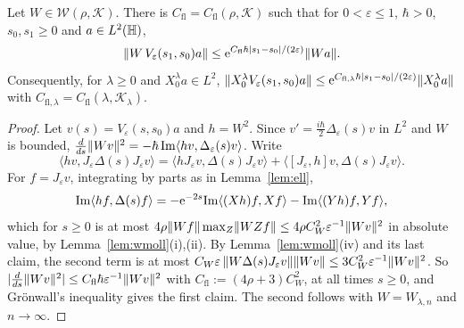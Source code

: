 \begin{proposition}\label{prop:ws}
Let $W\in\mathcal W(\rho,\mathcal K)$. There is $C_{\mathrm{fl}}=C_{\mathrm{fl}}(\rho,\mathcal K)$ such that for $0<\varepsilon\le1$, $\hbar>0$, $s_0,s_1\ge0$ and $a\in L^2(\mathbb{H})$,
\[
\lVert W\,V_\varepsilon(s_1,s_0)a\rVert\le\mathrm{e}^{C_{\mathrm{fl}}\hbar|s_1-s_0|/(2\varepsilon)}\lVert Wa\rVert.
\]
Consequently, for $\lambda\ge0$ and $X_0^\lambda a\in L^2$,
$\lVert X_0^\lambda V_\varepsilon(s_1,s_0)a\rVert\le\mathrm{e}^{C_{\mathrm{fl},\lambda}\hbar|s_1-s_0|/(2\varepsilon)}\lVert X_0^\lambda a\rVert$ with $C_{\mathrm{fl},\lambda}=C_{\mathrm{fl}}(\lambda,\mathcal K_\lambda)$.
\end{proposition}
\begin{proof}
Let $v(s)=V_\varepsilon(s,s_0)a$ and $h=W^2$. Since $v'=\tfrac{i\hbar}2\Delta_\varepsilon(s)v$ in $L^2$ and $W$ is bounded,
$\tfrac d{ds}\lVert Wv\rVert^2=-\hbar\,\mathrm{Im}\langle hv,\Delta_\varepsilon(s)v\rangle$. Write
\[
\langle hv,J_\varepsilon\Delta(s)J_\varepsilon v\rangle=\langle hJ_\varepsilon v,\Delta(s)J_\varepsilon v\rangle+\langle[J_\varepsilon,h]v,\Delta(s)J_\varepsilon v\rangle .
\]
For $f=J_\varepsilon v$, integrating by parts as in Lemma~\ref{lem:ell},
\[\mathrm{Im}\langle hf,\Delta(s)f\rangle=-\mathrm{e}^{-2s}\mathrm{Im}\langle(Xh)f,Xf\rangle-\mathrm{Im}\langle(Yh)f,Yf\rangle,\]
which for $s\ge0$ is at
most $4\rho\lVert Wf\rVert\max_Z\lVert WZf\rVert\le4\rho C_W^2\varepsilon^{-1}\lVert Wv\rVert^2$ in absolute value, by Lemma~\ref{lem:wmoll}(i),(ii). By
Lemma~\ref{lem:wmoll}(iv) and its last claim, the second term is at most
$C_W\varepsilon\,\lVert W\Delta(s)J_\varepsilon v\rVert\lVert Wv\rVert\le3C_W^2\varepsilon^{-1}\lVert Wv\rVert^2$. So
$|\tfrac d{ds}\lVert Wv\rVert^2|\le C_{\mathrm{fl}}\hbar\varepsilon^{-1}\lVert Wv\rVert^2$ with $C_{\mathrm{fl}}:=(4\rho+3)C_W^2$, at all times $s\ge0$, and Gr\"onwall's inequality gives
the first claim. The second follows with $W=W_{\lambda,n}$ and $n\to\infty$.
\end{proof}

